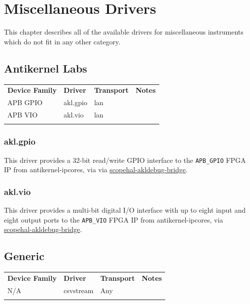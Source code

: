 \chapter{Miscellaneous Drivers}
\label{sec:misc-drivers}

This chapter describes all of the available drivers for miscellaneous instruments which do not fit in any other
category.

\section{Antikernel Labs}

\begin{tabularx}{16cm}{lllX}
\thickhline
\textbf{Device Family} & \textbf{Driver} & \textbf{Transport} & \textbf{Notes} \\
\thickhline
APB GPIO & akl.gpio & lan & \\
\thinhline
APB VIO & akl.vio & lan & \\
\thickhline
\end{tabularx}

\subsection{akl.gpio}

This driver provides a 32-bit read/write GPIO interface to the \verb|APB_GPIO| FPGA IP from antikernel-ipcores, via
via \href{https://github.com/ngscopeclient/scopehal-akldebug-bridge}{scopehal-akldebug-bridge}.

\subsection{akl.vio}

This driver provides a multi-bit digital I/O interface with up to eight input and eight output ports to the \verb|APB_VIO|
FPGA IP from antikernel-ipcores, via \href{https://github.com/ngscopeclient/scopehal-akldebug-bridge}{scopehal-akldebug-bridge}.

\section{Generic}

\begin{tabularx}{16cm}{lllX}
\thickhline
\textbf{Device Family} & \textbf{Driver} & \textbf{Transport} & \textbf{Notes} \\
\thickhline
N/A & csvstream & Any & \\
\thickhline
\end{tabularx}

